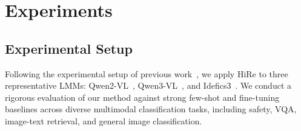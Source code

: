 \documentclass[sigconf,review,anonymous,9pt,table]{acmart}
\begin{document}
\section{Experiments}


\subsection{Experimental Setup}
\label{sec:setup}

Following the experimental setup of previous work~\cite{mitra2025enhancing}, we apply HiRe to three representative LMMs: Qwen2-VL~\cite{wang2024qwen2}, Qwen3-VL~\cite{bai2025qwen3}, and Idefics3~\cite{laurenccon2024building}. We conduct a rigorous evaluation of our method against strong few-shot and fine-tuning baselines across diverse multimodal classification tasks, including safety, VQA, image-text retrieval, and general image classification.
\end{document}
